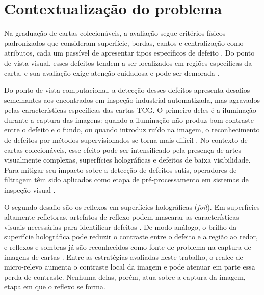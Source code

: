 \documentclass[
    12pt,                %
    openright,           %
    oneside,             %
    a4paper,             %
    english,             %
    brazil               %
]{abntex2}
\begin{document}
\section{Contextualização do problema}
\label{sec:contextualizacao}

Na graduação de cartas colecionáveis, a avaliação segue critérios 
físicos padronizados que consideram superfície, bordas, cantos e 
centralização como atributos, cada um passível de
apresentar tipos específicos de defeito \cite{Nahar2025}. Do ponto de
vista visual, esses defeitos tendem a ser localizados em regiões
específicas da carta, e sua avaliação exige atenção cuidadosa e pode
ser demorada \cite{Nahar2025}.

Do ponto de vista computacional, a detecção desses defeitos apresenta desafios
semelhantes aos encontrados em inspeção industrial automatizada, mas agravados
pelas características específicas das cartas TCG. O primeiro deles é a iluminação
durante a captura das imagens: quando a iluminação não produz bom
contraste entre o defeito e o fundo, ou quando introduz ruído na imagem,
o reconhecimento de defeitos por métodos supervisionados se torna mais
difícil \cite{Zheng2021}. No contexto de cartas colecionáveis, esse
efeito pode ser intensificado pela presença de artes visualmente complexas,
superfícies holográficas e defeitos de baixa visibilidade. Para mitigar seu impacto sobre a detecção de defeitos sutis,
operadores de filtragem têm sido aplicados como etapa de
pré-processamento em sistemas de inspeção visual
\cite{Sawada2024, Jiang2023}.

O segundo desafio são os reflexos em superfícies holográficas
(\textit{foil}). Em superfícies altamente refletoras, artefatos de
reflexo podem mascarar as características visuais necessárias para
identificar defeitos \cite{KimMG2026}. De modo análogo, o brilho da
superfície holográfica pode reduzir o contraste entre o defeito e a
região ao redor, e reflexos e sombras já são reconhecidos como fonte de
problema na captura de imagens de cartas \cite{Nahar2025}. Entre as estratégias avaliadas
neste trabalho, o realce de micro-relevo aumenta o contraste local da
imagem e pode atenuar em parte essa perda de contraste. Nenhuma delas,
porém, atua sobre a captura da imagem, etapa em que o reflexo se forma.
\end{document}
